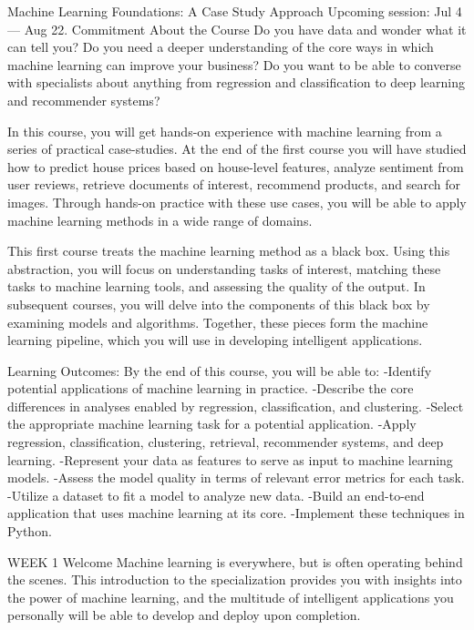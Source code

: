 Machine Learning Foundations: A Case Study Approach
Upcoming session: Jul 4 — Aug 22.
Commitment
About the Course
Do you have data and wonder what it can tell you?  Do you need a deeper understanding of the core ways in which machine learning can improve your business?  Do you want to be able to converse with specialists about anything from regression and classification to deep learning and recommender systems?

In this course, you will get hands-on experience with machine learning from a series of practical case-studies.  At the end of the first course you will have studied how to predict house prices based on house-level features, analyze sentiment from user reviews, retrieve documents of interest, recommend products, and search for images.  Through hands-on practice with these use cases, you will be able to apply machine learning methods in a wide range of domains.

This first course treats the machine learning method as a black box.  Using this abstraction, you will focus on understanding tasks of interest, matching these tasks to machine learning tools, and assessing the quality of the output. In subsequent courses, you will delve into the components of this black box by examining models and algorithms.  Together, these pieces form the machine learning pipeline, which you will use in developing intelligent applications.

Learning Outcomes:  By the end of this course, you will be able to:
   -Identify potential applications of machine learning in practice.  
   -Describe the core differences in analyses enabled by regression, classification, and clustering.
   -Select the appropriate machine learning task for a potential application.  
   -Apply regression, classification, clustering, retrieval, recommender systems, and deep learning.
   -Represent your data as features to serve as input to machine learning models. 
   -Assess the model quality in terms of relevant error metrics for each task.
   -Utilize a dataset to fit a model to analyze new data.
   -Build an end-to-end application that uses machine learning at its core.  
   -Implement these techniques in Python.

WEEK 1
Welcome
Machine learning is everywhere, but is often operating behind the scenes.
This introduction to the specialization provides you with insights into the power of machine learning, and the multitude of intelligent applications you personally will be able to develop and deploy upon completion.

